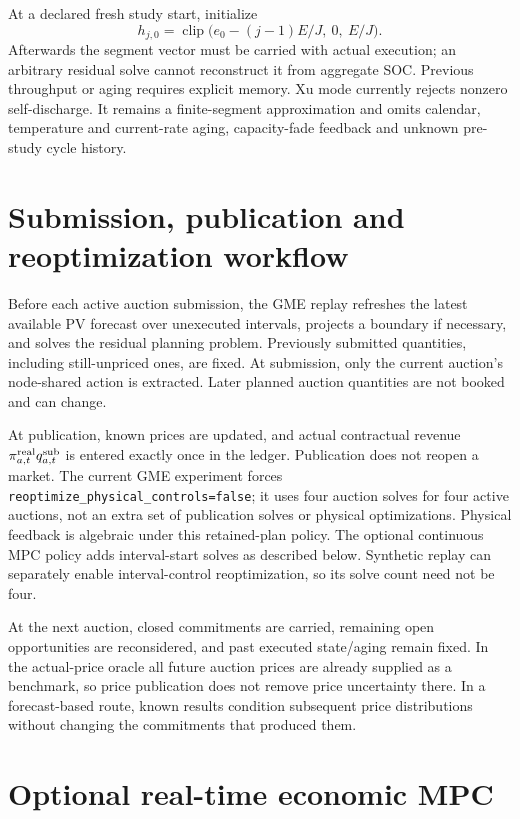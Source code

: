 \documentclass[11pt,a4paper]{article}
\DeclareMathOperator{\clip}{clip}
\begin{document}
At a declared fresh study start, initialize
\begin{equation}
 h_{j,0}=\clip\big(e_0-(j-1)E/J,\ 0,\ E/J\big).
\end{equation}
Afterwards the segment vector must be carried with actual execution; an arbitrary
residual solve cannot reconstruct it from aggregate SOC. Previous throughput or
aging requires explicit memory. Xu mode currently rejects nonzero self-discharge.
It remains a finite-segment approximation and omits calendar, temperature and
current-rate aging, capacity-fade feedback and unknown pre-study cycle history.

\section{Submission, publication and reoptimization workflow}

Before each active auction submission, the GME replay refreshes the latest
available PV forecast over unexecuted intervals, projects a boundary if necessary,
and solves the residual planning problem. Previously submitted quantities,
including still-unpriced ones, are fixed. At submission, only the current
auction's node-shared action is extracted. Later planned auction quantities are
not booked and can change.

At publication, known prices are updated, and actual contractual revenue
$\pi^{\rm real}_{a,t}q^{\rm sub}_{a,t}$ is entered exactly once in the ledger.
Publication does not reopen a market. The current GME experiment forces
\texttt{reoptimize\_physical\_controls=false}; it uses four auction solves for
four active auctions, not an extra set of publication solves or physical
optimizations. Physical feedback is algebraic under this retained-plan policy.
The optional continuous MPC policy adds interval-start solves as described below.
Synthetic replay can separately
enable interval-control reoptimization, so its solve count need not be four.

At the next auction, closed commitments are carried, remaining open opportunities
are reconsidered, and past executed state/aging remain fixed. In the actual-price
oracle all future auction prices are already supplied as a benchmark, so price
publication does not remove price uncertainty there. In a forecast-based route,
known results condition subsequent price distributions without changing the
commitments that produced them.

\section{Optional real-time economic MPC}
\label{sec:realtime-mpc}
\end{document}
